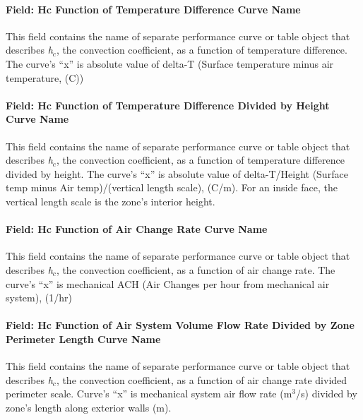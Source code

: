 \paragraph{Field: Hc Function of Temperature Difference Curve Name}\label{field-hc-function-of-temperature-difference-curve-name}

This field contains the name of separate performance curve or table object that describes \emph{h\(_{c}\)}, the convection coefficient, as a function of temperature difference. The curve's ``x'' is absolute value of delta-T (Surface temperature minus air temperature, (C))

\paragraph{Field: Hc Function of Temperature Difference Divided by Height Curve Name}\label{field-hc-function-of-temperature-difference-divided-by-height-curve-name}

This field contains the name of separate performance curve or table object that describes \emph{h\(_{c}\)}, the convection coefficient, as a function of temperature difference divided by height. The curve's ``x'' is absolute value of delta-T/Height (Surface temp minus Air temp)/(vertical length scale), (C/m). For an inside face, the vertical length scale is the zone's interior height.

\paragraph{Field: Hc Function of Air Change Rate Curve Name}\label{field-hc-function-of-air-change-rate-curve-name}

This field contains the name of separate performance curve or table object that describes \emph{h\(_{c}\)}, the convection coefficient, as a function of air change rate. The curve's ``x'' is mechanical ACH (Air Changes per hour from mechanical air system), (1/hr)

\paragraph{Field: Hc Function of Air System Volume Flow Rate Divided by Zone Perimeter Length Curve Name}\label{field-hc-function-of-air-system-volume-flow-rate-divided-by-zone-perimeter-length-curve-name}

This field contains the name of separate performance curve or table object that describes \emph{h\(_{c}\)}, the convection coefficient, as a function of air change rate divided perimeter scale. Curve's ``x'' is mechanical system air flow rate (m\(^{3}\)/s) divided by zone's length along exterior walls (m).

